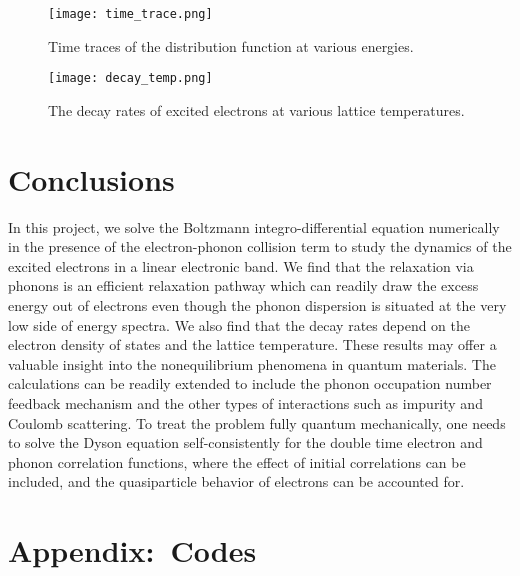 \documentclass[aps,prl,twocolumn,showpacs,floatfix,superscriptaddress]{revtex4-1}
\begin{document}
\begin{figure}
        \texttt{[image: time\_trace.png]}
        \caption{Time traces of the distribution function at various energies.}
        \label{fig:traces}
\end{figure}

\begin{figure}
        \texttt{[image: decay\_temp.png]}
        \caption{The decay rates of excited electrons at various lattice temperatures.}
        \label{fig:rates}
\end{figure}

\section{Conclusions}

In this project, we solve the Boltzmann integro-differential equation numerically in the presence of the electron-phonon collision term to study the dynamics of the excited electrons in a linear electronic band. We find that the relaxation via phonons is an efficient relaxation pathway which can readily draw the excess energy out of electrons even though the phonon dispersion is situated at the very low side of energy spectra. We also find that the decay rates depend on the electron density of states and the lattice temperature. These results may offer a valuable insight into the nonequilibrium phenomena in quantum materials. The calculations can be readily extended to include the phonon occupation number feedback mechanism and the other types of interactions such as impurity and Coulomb scattering. To treat the problem fully quantum mechanically, one needs to solve the Dyson equation self-consistently for the double time electron and phonon correlation functions, where the effect of initial correlations can be included, and the quasiparticle behavior of electrons can be accounted for\cite{algorithm}. 




\section*{Appendix:~Codes}



\end{document}
